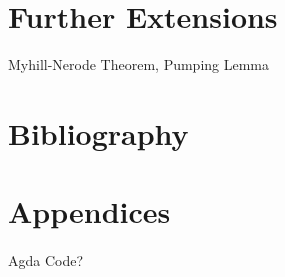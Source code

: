 \documentclass[twoside,openright,final]{bhamthesis}
\begin{document}
\newpage


\newpage


\newpage


\newpage
\section{Further Extensions}
\par Myhill-Nerode Theorem, Pumping Lemma

\newpage


\newpage



\newpage
\section*{Bibliography}
\nocite{*}



\newpage
\section*{Appendices}
\paragraph{} Agda Code?
\end{document}
